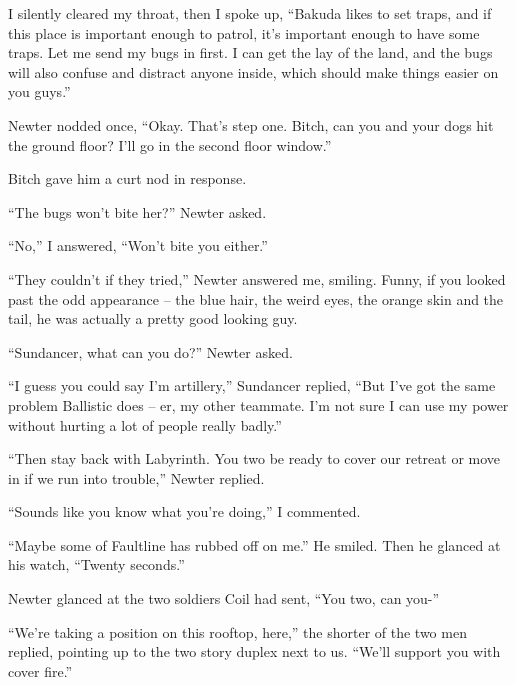 I silently cleared my throat, then I spoke up, ``Bakuda likes to set traps, and if this place is important enough to patrol, it's important enough to have some traps.  Let me send my bugs in first.  I can get the lay of the land, and the bugs will also confuse and distract anyone inside, which should make things easier on you guys.''



Newter nodded once, ``Okay.  That's step one.  Bitch, can you and your dogs hit the ground floor?  I'll go in the second floor window.''



Bitch gave him a curt nod in response.



``The bugs won't bite her?'' Newter asked.



``No,'' I answered, ``Won't bite you either.''



``They couldn't if they tried,'' Newter answered me, smiling.  Funny, if you looked past the odd appearance – the blue hair, the weird eyes, the orange skin and the tail, he was actually a pretty good looking guy.



``Sundancer, what can you do?'' Newter asked.



``I guess you could say I'm artillery,'' Sundancer replied, ``But I've got the same problem Ballistic does – er, my other teammate.  I'm not sure I can use my power without hurting a lot of people really badly.''



``Then stay back with Labyrinth.  You two be ready to cover our retreat or move in if we run into trouble,'' Newter replied.



``Sounds like you know what you're doing,'' I commented.



``Maybe some of Faultline has rubbed off on me.''  He smiled.  Then he glanced at his watch, ``Twenty seconds.''



Newter glanced at the two soldiers Coil had sent, ``You two, can you-''



``We're taking a position on this rooftop, here,'' the shorter of the two men replied, pointing up to the two story duplex next to us.  ``We'll support you with cover fire.''



